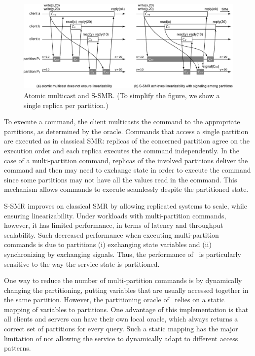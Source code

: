 

\begin{figure}
  \begin{minipage}[b]{1.0\linewidth}
  \centering
        \includegraphics[width=1\linewidth]{figures/ssmr}
  \end{minipage}
  \caption{Atomic multicast and S-SMR. (To simplify the figure, we show a single replica per partition.)}
  \label{fig:ssmr}
\end{figure}

To execute a command, the client multicasts the command to the appropriate
partitions, as determined by the oracle. Commands that access a single partition
are executed as in classical SMR: replicas of the concerned partition agree on
the execution order and each replica executes the command independently. In the
case of a multi-partition command, replicas of the involved partitions deliver
the command and then may need to exchange state in order to execute the command
since some partitions may not have all the values read in the command. This
mechanism allows commands to execute seamlessly despite the partitioned state.

S-SMR improves on classical SMR by allowing replicated systems to scale, while
ensuring linearizability. Under workloads with multi-partition commands,
however, it has limited performance, in terms of latency and throughput
scalability. Such decreased performance when executing multi-partition commands
is due to partitions (i) exchanging state variables and (ii) synchronizing by
exchanging signals. Thus, the performance of \ssmr\ is particularly
sensitive to the way the service state is partitioned.

One way to reduce the number of multi-partition commands is by dynamically
changing the partitioning, putting variables that are usually accessed together
in the same partition. However, the partitioning oracle of \ssmr\ relies on a
static mapping of variables to partitions. One advantage of this implementation
is that all clients and servers can have their own local oracle, which always
returns a correct set of partitions for every query. Such a static mapping has
the major limitation of not allowing the service to dynamically adapt to
different access patterns.

